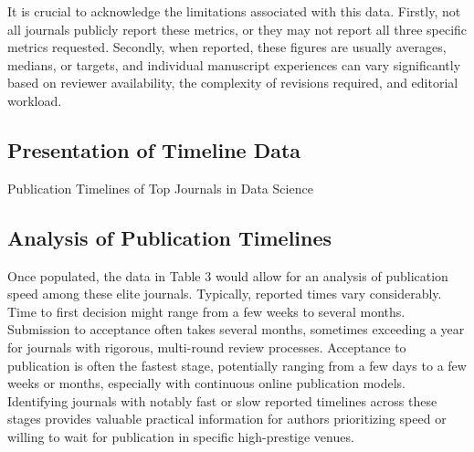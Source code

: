 \documentclass[../main.tex]{subfiles}
\begin{document}
\vspace{0.2cm}
\noindent
It is crucial to acknowledge the limitations associated with this data. Firstly, not all journals publicly report these metrics, or they may not report all three specific metrics requested. Secondly, when reported, these figures are usually averages, medians, or targets, and individual manuscript experiences can vary significantly based on reviewer availability, the complexity of revisions required, and editorial workload. 


\subsection{Presentation of Timeline Data}

\begin{table}[H]
    \centering
    \scriptsize
    \caption{Publication Timelines of Top Journals in Data Science}
    \label{tab:publication_timeline}
\end{table}

\subsection{Analysis of Publication Timelines}

\vspace{0.4cm}
\noindent
Once populated, the data in Table 3 would allow for an analysis of publication speed among these elite journals. Typically, reported times vary considerably. Time to first decision might range from a few weeks to several months. Submission to acceptance often takes several months, sometimes exceeding a year for journals with rigorous, multi-round review processes. Acceptance to publication is often the fastest stage, potentially ranging from a few days to a few weeks or months, especially with continuous online publication models. Identifying journals with notably fast or slow reported timelines across these stages provides valuable practical information for authors prioritizing speed or willing to wait for publication in specific high-prestige venues.
\end{document}
